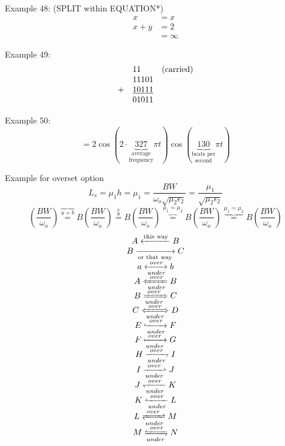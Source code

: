 \documentclass{book}
\begin{document}
\noindent Example 48: (SPLIT within EQUATION*)
\begin{equation*}
\begin{split}
x &= x\\
x + y&=2 \\
  &= \infty
\end{split}
\end{equation*}

\noindent Example 49:
\begin{equation*}
\begin{array}{@{}lll@{}}
  &11    & \mbox{(carried)} \\
  &11101 & \\
+ &\underline{10111} & \\
  &01011 &
\end{array}
\end{equation*}

\noindent Example 50:
\[ = 2\cos (2\cdot
\underset{\mbox{frequency}}{\underset{\mbox{average}}{\underbrace{327}}} \pi
t) \cos
(\underset{\mbox{second}}{\underset{\mbox{beats per}}{\underbrace{130}}} \pi
t)\]

Example for overset option
\begin{equation}
L_s=\mu_1h=\mu_1=\frac{BW}{\omega_o\sqrt{\mu_2\epsilon_2}}=\frac{\mu_1}{\sqrt{\mu_2\epsilon_2}}
\end{equation}
\begin{equation}
\left(\frac{BW}{\omega_o}\right)
\overset{\overbrace{a+b}}{=} B 
\left(\frac{BW}{\omega_o}\right)
\overset{\overset{a}{b}}{=} B 
\left(\frac{BW}{\omega_o}\right)
\overset{\mu_1=\mu_2}{\overbrace{=}} B 
\left(\frac{BW}{\omega_o}\right)
\overset{\underbrace{\mu_1=\mu_2}}{=} B 
\left(\frac{BW}{\omega_o}\right)
\end{equation}
\begin{equation}
\begin{array}{c}
 A \xleftarrow{\text{this way}} B \\
 B \xrightarrow[\text{or that way}]{ } C \\
 a \xleftrightarrow[under]{over} b\\
 A \xLeftarrow[under]{over} B\\
 B \xRightarrow[under]{over} C\\
 C \xLeftrightarrow[under]{over} D\\
 E \xhookrightarrow[under]{over} F\\
 F \xmapsto[under]{over} G\\
 H \xrightharpoondown[under]{over} I\\[5pt]
 I \xrightharpoonup[under]{over} J\\[5pt]
 J \xleftharpoondown[under]{over} K\\[5pt]
 K \xleftharpoonup[under]{over} L\\[5pt]
 L \xrightleftharpoons[under]{over} M\\[5pt]
 M \xleftrightharpoons[under]{over} N
\end{array}
\end{equation}
\end{document}
